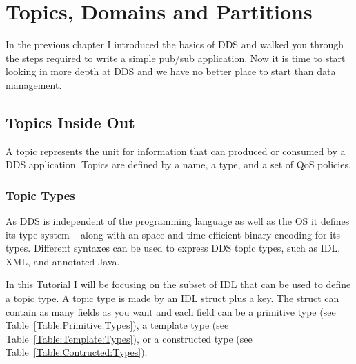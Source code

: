 \chapter{Topics, Domains and Partitions}\label{Chapter:Topics:Domain:Partitions}
In the previous chapter I introduced the basics of DDS and 
walked you through the steps required to write a simple pub/sub 
application. Now it is time to start looking in more depth at DDS 
and we have no better place to start than data management.

\section{Topics Inside Out}
A topic represents the unit for information that can produced 
or consumed by a \ac{DDS} application. Topics are defined by a name, a type, 
and a set of \ac{QoS} policies. 

\subsection{Topic Types}
As \ac{DDS} is independent of the programming language as well as the \ac{OS}
it defines its type system  ~\cite{OMG:DDS:XTYPES:10} along with an space and time 
efficient binary encoding for its types. 
Different syntaxes can be used to express \ac{DDS} topic types, such as IDL, XML, and annotated Java. 

In this Tutorial I will be focusing on the subset of \ac{IDL} that can be used 
to define a topic type. A topic type is made by an \ac{IDL}  struct plus a key.  
The struct can contain as many fields as you want and each field  can be a 
primitive type (see Table~\ref{Table:Primitive:Types}),  a template type 
(see Table~\ref{Table:Template:Types}), or a  constructed type 
(see Table~\ref{Table:Contructed:Types}).


